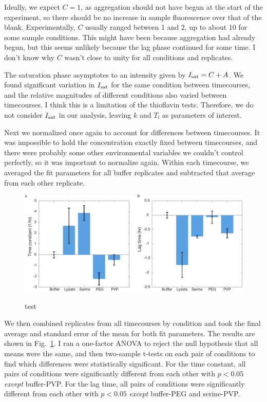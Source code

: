 Ideally, we expect $C=1$, as aggregation should not have begun at the start of the experiment, so there should be no increase in sample fluorescence over that of the blank.  Experimentally, $C$ usually ranged between 1 and 2, up to about 10 for some sample conditions.  This might have been because aggregation had already begun, but this seems unlikely because the lag phase continued for some time.  I don't know why  $C$ wasn't close to unity for all conditions and replicates.

The saturation phase asymptotes to an intensity given by $I_{\mathrm{sat}}=C+A$.  We found significant variation in $I_{\mathrm{sat}}$ for the same condition between timecourses, and the relative magnitudes of different conditions also varied between timecourses.  I think this is a limitation of the thioflavin tests.  Therefore, we do not consider $I_{\mathrm{sat}}$ in our analysis, leaving $k$ and $T_l$ as parameters of interest.

Next we normalized once again to account for differences between timecourses.  It was impossible to hold the concentration exactly fixed between timecourses, and there were probably some other environmental variables we couldn't control perfectly, so it was important to normalize again.  Within each timecourse, we averaged the fit parameters for all buffer replicates and subtracted that average from each other replicate.

\begin{figure}
\caption{test}
\centering
\includegraphics[width=\textwidth]{figs/ch05/barCharts}
\label{fig:fitParams}
\end{figure}

We then combined replicates from all timecourses by condition and took the final average and standard error of the mean for both fit parameters.  The results are shown in Fig.~\ref{fig:fitParams}.  I ran a one-factor ANOVA to reject the null hypothesis that all means were the same, and then two-sample t-tests on each pair of conditions to find which differences were statistically significant.  For the time constant, all pairs of conditions were significantly different from each other with $p < 0.05$ \emph{except} buffer-PVP.   For the lag time, all pairs of conditions were significantly different from each other with $p < 0.05$ \emph{except} buffer-PEG and serine-PVP.

